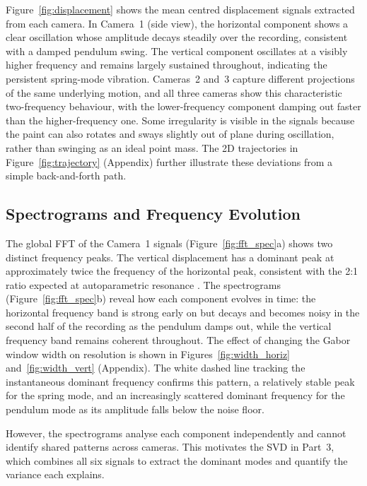 \documentclass[12pt,a4paper]{article}
\begin{document}
Figure~\ref{fig:displacement} shows the mean centred displacement signals extracted from each camera. In Camera~1 (side view), the horizontal component shows a clear oscillation whose amplitude decays steadily over the recording, consistent with a damped pendulum swing. The vertical component oscillates at a visibly higher frequency and remains largely sustained throughout, indicating the persistent spring-mode vibration. Cameras~2 and~3 capture different projections of the same underlying motion, and all three cameras show this characteristic two-frequency behaviour, with the lower-frequency component damping out faster than the higher-frequency one. Some irregularity is visible in the signals because the paint can also rotates and sways slightly out of plane during oscillation, rather than swinging as an ideal point mass. The 2D trajectories in Figure~\ref{fig:trajectory} (Appendix) further illustrate these deviations from a simple back-and-forth path.

\subsection{Spectrograms and Frequency Evolution}

The global FFT of the Camera~1 signals (Figure~\ref{fig:fft_spec}a) shows two distinct frequency peaks. The vertical displacement has a dominant peak at approximately twice the frequency of the horizontal peak, consistent with the 2:1 ratio expected at autoparametric resonance \citep{nayfeh1979, lynch2002}. The spectrograms (Figure~\ref{fig:fft_spec}b) reveal how each component evolves in time: the horizontal frequency band is strong early on but decays and becomes noisy in the second half of the recording as the pendulum damps out, while the vertical frequency band remains coherent throughout. The effect of changing the Gabor window width on resolution is shown in Figures~\ref{fig:width_horiz} and~\ref{fig:width_vert} (Appendix). The white dashed line tracking the instantaneous dominant frequency confirms this pattern, a relatively stable peak for the spring mode, and an increasingly scattered dominant frequency for the pendulum mode as its amplitude falls below the noise floor.

However, the spectrograms analyse each component independently and cannot identify shared patterns across cameras. This motivates the SVD in Part~3, which combines all six signals to extract the dominant modes and quantify the variance each explains.
\end{document}
